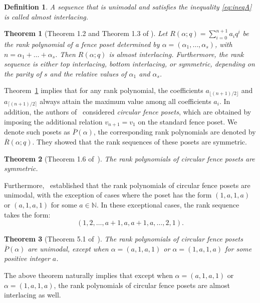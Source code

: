 \documentclass{article}
\newtheorem{definition}{Definition}
\newtheorem{theorem}{Theorem}
\theoremstyle{remark}
\begin{document}
\begin{definition}
A sequence that is unimodal and satisfies the inequality \eqref{eq:ineqA} is called \emph{almost interlacing}.
\end{definition}

\begin{theorem}[Theorem 1.2 and Theorem 1.3 of   \cite{OR23}]\label{thm:rankuni}
    Let \( R(\alpha; q) = \sum_{i=0}^{n+1} a_i q^i \) be the rank polynomial of a fence poset determined by \( \alpha = (\alpha_1, \ldots, \alpha_s) \), with \( n = \alpha_1 + \dots + \alpha_s \). Then \( R(\alpha; q) \) is almost interlacing. Furthermore, the rank sequence is either top interlacing, bottom interlacing, or symmetric, depending on the parity of \( s \) and the relative values of \( \alpha_1 \) and \( \alpha_s \).
\end{theorem}

Theorem~\ref{thm:rankuni} implies that for any rank polynomial, the coefficients \( a_{\lfloor (n+1)/2 \rfloor} \) and \( a_{\lceil (n+1)/2 \rceil} \) always attain the maximum value among all coefficients \( a_i \). In addition, the authors of~\cite{OR23} considered \emph{circular fence posets}, which are obtained by imposing the additional relation \( v_{n+1} = v_1 \) on the standard fence poset. We denote such posets as \( \overline{P}(\alpha) \), the corresponding rank polynomials are denoted by \( \overline{R}(\alpha; q) \). They showed that the rank sequences of these posets are symmetric.


\begin{theorem}[Theorem 1.6 of~\cite{OR23}]\label{thm:circular}
    The rank polynomials of circular fence posets are symmetric.
\end{theorem}

Furthermore,~\cite{OOR24} established that the rank polynomials of circular fence posets are unimodal, with the exception of cases where the poset has the form \( (1,a,1,a) \) or \( (a,1,a,1) \) for some \( a \in \mathbb{N} \). In these exceptional cases, the rank sequence takes the form:
\[
(1, 2, \ldots, a+1, a, a+1, a, \ldots, 2, 1).
\]

\begin{theorem}[Theorem 5.1 of~\cite{OOR24}]\label{thm:circuni}
    The rank polynomials of circular fence posets \( \overline{P}(\alpha) \) are unimodal, except when \( \alpha = (a,1,a,1) \) or \( \alpha = (1,a,1,a) \) for some positive integer \( a \).
\end{theorem}

The above theorem naturally implies that except when \( \alpha = (a,1,a,1) \) or \( \alpha = (1,a,1,a) \), the rank polynomials of circular fence posets are almost interlacing as well.
\end{document}

